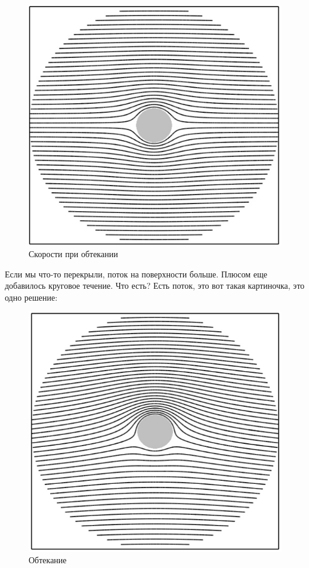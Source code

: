\begin{figure}[H]
    \centering
    \includegraphics[scale=0.5]{photo/obtekaniecilindra1}
    \caption{Скорости при обтекании}
    \label{fig:figure1}
\end{figure}

Если мы что-то перекрыли, поток на поверхности больше. Плюсом еще добавилось круговое течение. Что есть? Есть поток, это вот такая картиночка, это одно решение:
\begin{figure}[H]
    \centering
    \includegraphics[scale=0.5]{photo/obtekaniecilindra2}
    \caption{Обтекание}
    \label{fig:figure1}
\end{figure}
